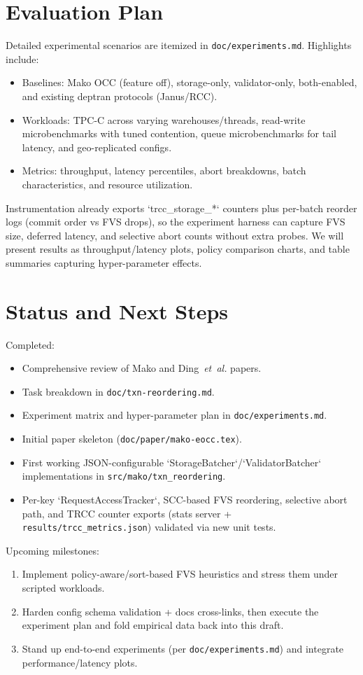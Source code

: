 \documentclass[letterpaper,twocolumn,10pt]{article}
\newcommand{\sysname}{Mako\xspace}
\begin{document}
\section{Evaluation Plan}
Detailed experimental scenarios are itemized in \texttt{doc/experiments.md}. Highlights include:
\begin{itemize}[leftmargin=*]
  \item Baselines: Mako OCC (feature off), storage-only, validator-only, both-enabled, and existing deptran protocols (Janus/RCC).
  \item Workloads: TPC-C across varying warehouses/threads, read-write microbenchmarks with tuned contention, queue microbenchmarks for tail latency, and geo-replicated configs.
  \item Metrics: throughput, latency percentiles, abort breakdowns, batch characteristics, and resource utilization.
\end{itemize}
Instrumentation already exports `trcc_storage_*` counters plus per-batch reorder logs (commit order vs FVS drops), so the experiment harness can capture FVS size, deferred latency, and selective abort counts without extra probes.
We will present results as throughput/latency plots, policy comparison charts, and table summaries capturing hyper-parameter effects.

\section{Status and Next Steps}
Completed:
\begin{itemize}[leftmargin=*]
  \item Comprehensive review of \sysname and Ding~\emph{et~al.} papers.
  \item Task breakdown in \texttt{doc/txn-reordering.md}.
    \item Experiment matrix and hyper-parameter plan in \texttt{doc/experiments.md}.
  \item Initial paper skeleton (\texttt{doc/paper/mako-eocc.tex}).
  \item First working JSON-configurable `StorageBatcher`/`ValidatorBatcher` implementations in \texttt{src/mako/txn\_reordering}.
  \item Per-key `RequestAccessTracker`, SCC-based FVS reordering, selective abort path, and TRCC counter exports (stats server + \texttt{results/trcc\_metrics.json}) validated via new unit tests.
\end{itemize}
Upcoming milestones:
\begin{enumerate}[leftmargin=*]
  \item Implement policy-aware/sort-based FVS heuristics and stress them under scripted workloads.
  \item Harden config schema validation + docs cross-links, then execute the experiment plan and fold empirical data back into this draft.
  \item Stand up end-to-end experiments (per \texttt{doc/experiments.md}) and integrate performance/latency plots.
\end{enumerate}
\end{document}
